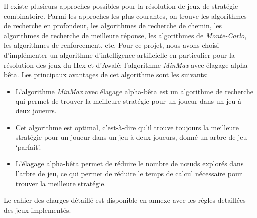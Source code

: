 Il existe plusieurs approches possibles pour la résolution de jeux de stratégie
combinatoire. Parmi les approches les plus courantes, on trouve les algorithmes
de recherche en profondeur, les algorithmes de recherche de chemin, les
algorithmes de recherche de meilleure réponse, les algorithmes de \emph{Monte-Carlo},
les algorithmes de renforcement, etc.
Pour ce projet, nous avons choisi d'implémenter un algorithme d'intelligence artificielle 
en particulier pour la résolution des jeux du Hex et d'Awalé: l'algorithme \emph{MinMax} avec élagage
alpha-bêta.
Les principaux avantages de cet algorithme sont les suivants:
\begin{itemize}
	\item L'algorithme \emph{MinMax} avec élagage alpha-bêta est un algorithme de recherche
	qui permet de trouver la meilleure stratégie pour un joueur dans un jeu à deux
	joueurs.
	\item Cet algorithme est optimal, c'est-à-dire qu'il trouve toujours la meilleure
	stratégie pour un joueur dans un jeu à deux joueurs, donné un arbre de jeu `parfait'.
	\item L'élagage alpha-bêta permet de réduire le nombre de nœuds explorés dans l'arbre
	de jeu, ce qui permet de réduire le temps de calcul nécessaire pour trouver la meilleure
	stratégie.
\end{itemize}

Le cahier des charges détaillé est disponible en annexe avec les règles detaillées des jeux implementés.
